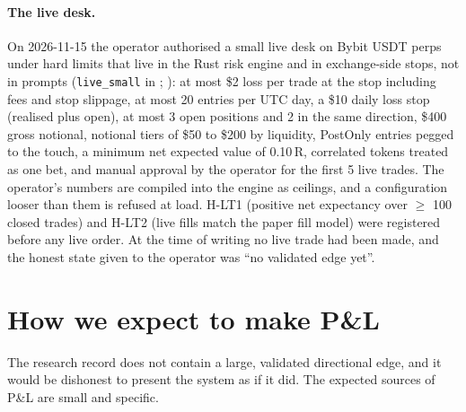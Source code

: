 \documentclass[10pt,a4paper]{article}
\newcommand{\hyp}[1]{\textsf{#1}}
\begin{document}
\paragraph{The live desk.} On 2026-11-15 the operator authorised a small live desk on Bybit USDT perps under hard limits that live in the Rust risk engine and in exchange-side stops, not in prompts (\texttt{live\_small} in \protect{}; \protect{}): at most \$2 loss per trade at the stop including fees and stop slippage, at most 20 entries per UTC day, a \$10 daily loss stop (realised plus open), at most 3 open positions and 2 in the same direction, \$400 gross notional, notional tiers of \$50 to \$200 by liquidity, PostOnly entries pegged to the touch, a minimum net expected value of 0.10\,R, correlated tokens treated as one bet, and manual approval by the operator for the first 5 live trades. The operator's numbers are compiled into the engine as ceilings, and a configuration looser than them is refused at load. \hyp{H-LT1} (positive net expectancy over $\ge$ 100 closed trades) and \hyp{H-LT2} (live fills match the paper fill model) were registered before any live order. At the time of writing no live trade had been made, and the honest state given to the operator was ``no validated edge yet''.

\FloatBarrier
\section{How we expect to make P\&L}

The research record does not contain a large, validated directional edge, and it would be dishonest to present the system as if it did. The expected sources of P\&L are small and specific.
\end{document}
